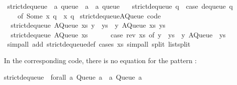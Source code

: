 \begin{isabellebody}
\ strict{\isacharunderscore}dequeue\ {\isacharcolon}{\isacharcolon}\ {\isachardoublequoteopen}{\isacharprime}a\ queue\ {\isasymRightarrow}\ {\isacharprime}a\ {\isasymtimes}\ {\isacharprime}a\ queue{\isachardoublequoteclose}\ \isanewline
\ \ {\isachardoublequoteopen}strict{\isacharunderscore}dequeue\ q\ {\isacharequal}\ {\isacharparenleft}case\ dequeue\ q\isanewline
\ \ \ \ of\ {\isacharparenleft}Some\ x{\isacharcomma}\ q{\isacharprime}{\isacharparenright}\ {\isasymRightarrow}\ {\isacharparenleft}x{\isacharcomma}\ q{\isacharprime}{\isacharparenright}{\isacharparenright}{\isachardoublequoteclose}\isanewline
\isanewline
{}\isamarkupfalse%
\ strict{\isacharunderscore}dequeue{\isacharunderscore}AQueue\ {\isacharbrackleft}code{\isacharbrackright}{\isacharcolon}\isanewline
\ \ {\isachardoublequoteopen}strict{\isacharunderscore}dequeue\ {\isacharparenleft}AQueue\ xs\ {\isacharparenleft}y\ {\isacharhash}\ ys{\isacharparenright}{\isacharparenright}\ {\isacharequal}\ {\isacharparenleft}y{\isacharcomma}\ AQueue\ xs\ ys{\isacharparenright}{\isachardoublequoteclose}\isanewline
\ \ {\isachardoublequoteopen}strict{\isacharunderscore}dequeue\ {\isacharparenleft}AQueue\ xs\ {\isacharbrackleft}{\isacharbrackright}{\isacharparenright}\ {\isacharequal}\isanewline
\ \ \ \ {\isacharparenleft}case\ rev\ xs\ of\ y\ {\isacharhash}\ ys\ {\isasymRightarrow}\ {\isacharparenleft}y{\isacharcomma}\ AQueue\ {\isacharbrackleft}{\isacharbrackright}\ ys{\isacharparenright}{\isacharparenright}{\isachardoublequoteclose}\isanewline
\ \ \isamarkupfalse%
\ {\isacharparenleft}simp{\isacharunderscore}all\ add{\isacharcolon}\ strict{\isacharunderscore}dequeue{\isacharunderscore}def{\isacharparenright}\ {\isacharparenleft}cases\ xs{\isacharcomma}\ simp{\isacharunderscore}all\ split{\isacharcolon}\ list{\isachardot}split{\isacharparenright}%
\endisatagquote
{\isafoldquote}%
%
\isadelimquote
%
\endisadelimquote
%
\begin{isamarkuptext}%
\noindent In the corresponding code, there is no equation
  for the pattern :%
\end{isamarkuptext}%
\isamarkuptrue%
%
\isadelimtypewriter
%
\endisadelimtypewriter
%
\isatagtypewriter
%
\begin{isamarkuptext}%
strict{\isacharunderscore}dequeue\ {\isacharcolon}{\isacharcolon}\ forall\ a{\isachardot}\ Queue\ a\ {\isacharminus}{\isachargreater}\ {\isacharparenleft}a{\isacharcomma}\ Queue\ a{\isacharparenright}{\isacharsemicolon}\isanewline

\end{isamarkuptext}
\end{isabellebody}

